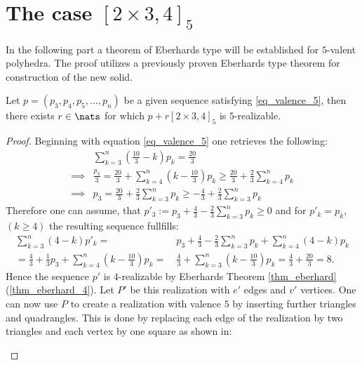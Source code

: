 \section{The case $[2 \times 3, 4]_5$}
In the following part a theorem of Eberhards type will be established for $5$-valent polyhedra. The proof utilizes a previously proven Eberhards type theorem for construction of the new solid.
\begin{theorem}
  Let $p = (p_3, p_4, p_5, \dots, p_n)$ be a given sequence satisfying \ref{eq_valence_5}, then there exists $r \in \nats$ for which $p + r [2 \times 3, 4]_5$ is $5$-realizable.
  \begin{proof}
    Beginning with equation \ref{eq_valence_5} one retrieves the following:
    \begin{align*}
      &\sum_{k=3}^n \left( \frac{10}{3} - k \right) p_k = \frac{20}{3} \\
      \implies & \frac{p_3}{3} = \frac{20}{3} + \sum_{k=4}^n \left(k - \frac{10}{3} \right) p_k \geq \frac{20}{3} + \frac{2}{3} \sum_{k=4}^n p_k \\
      \implies & p_3 = \frac{20}{3} + \frac{2}{3} \sum_{k=3}^n p_k \geq - \frac{4}{3} + \frac{2}{3} \sum_{k=3}^n p_k
    \end{align*}
    Therefore one can assume, that $p'_3 := p_3 + \frac{4}{3} - \frac{2}{3} \sum_{k=3}^n p_k \geq 0$ and for $p'_k = p_k$, $(k\geq 4)$ the resulting sequence fullfills:
   \begin{align*}
     \sum_{k=3}^n (4 - k) p'_k =&~ p_3 + \frac{4}{3} - \frac{2}{3} \sum_{k=3}^n p_k + \sum_{k=4}^n (4 - k) p_k \\
     = \frac{4}{3} + \frac{1}{3} p_3 + \sum_{k=4}^n \left(k - \frac{10}{3} \right) p_k =&~ \frac{4}{3} + \sum_{k=3}^n \left(k - \frac{10}{3} \right) p_k = \frac{4}{3} + \frac{20}{3} = 8.
   \end{align*}
   Hence the sequence $p'$ is $4$-realizable by Eberhards Theorem \ref{thm_eberhard}(\ref{thm_eberhard_4}). Let $P'$ be this realization with $e'$ edges and $v'$ vertices. One can now use $P$ to create a realization with valence $5$ by inserting further triangles and quadrangles. This is done by replacing each edge of the realization by two triangles and each vertex by one square as shown in:

   \begin{figure}[hptt]\centering
\end{figure}
\end{proof}
\end{theorem}

